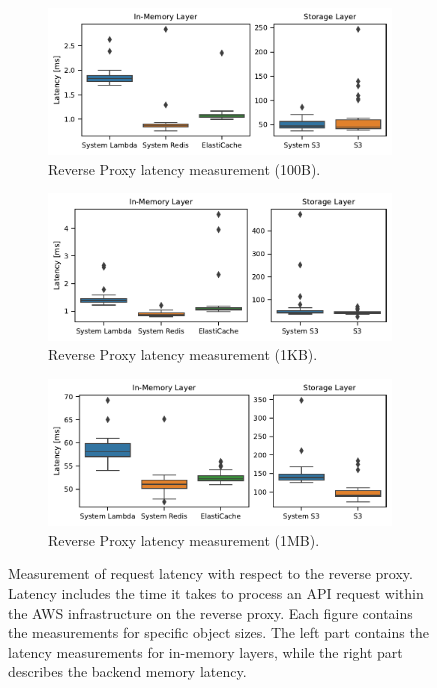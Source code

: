 \begin{figure}[pht!]
    \centering
    \begin{subfigure}{.85\textwidth}
        \includegraphics[width=\linewidth]{figures/proxy_latency_100B.pdf}
        \caption{Reverse Proxy latency measurement (100B).}
        \label{fig:proxy_latency_100B}
    \end{subfigure}
    
    \begin{subfigure}{.85\textwidth}
        \includegraphics[width=\linewidth]{figures/proxy_latency_1KB.pdf}
        \caption{Reverse Proxy latency measurement (1KB).}
        \label{fig:proxy_latency_1KB}
    \end{subfigure}

    \begin{subfigure}{.85\textwidth}
        \includegraphics[width=\linewidth]{figures/proxy_latency_1MB.pdf}
        \caption{Reverse Proxy latency measurement (1MB).}
        \label{fig:proxy_latency_1MB}
    \end{subfigure}

    \caption{Measurement of request latency with respect to the reverse proxy. Latency includes the time it takes to process an API request within the AWS infrastructure on the reverse proxy. Each figure contains the measurements for specific object sizes. The left part contains the latency measurements for in-memory layers, while the right part describes the backend memory latency.}
    \label{fig:latency_proxy}
\end{figure}

